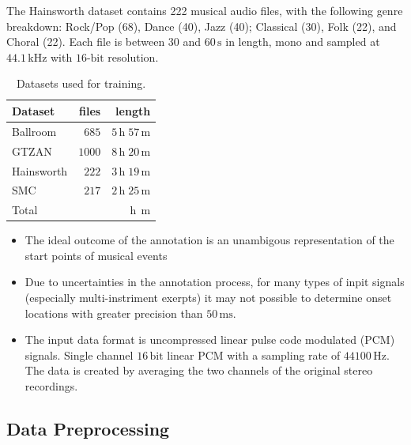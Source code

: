 \documentclass{scrartcl}
\begin{document}
The Hainsworth dataset \cite{Hainsworth2004} contains 222 musical audio files, with the following genre breakdown: Rock/Pop (68), Dance (40), Jazz (40); Classical (30), Folk (22), and Choral (22). Each file is between $30$ and $60\,\text{s}$ in length, mono and sampled at $44.1\,\text{kHz}$ with $16\text{-bit}$ resolution.
\begin{table}[htbp]
\caption{Datasets used for training.}
\label{tab:datasets}
\centering

\begin{tabular}{lrr}
\hline

\hline
\textbf{Dataset} & \textbf{files} & \textbf{length} \\
\hline
    Ballroom \cite{Gouyon2006b, Krebs2013} & $685$ & $5\,\text{h} \;57\,\text{m}$\\
    GTZAN \cite{Tzanetakis2002b, marchand2015swing} & $1000$ & $8\,\text{h}\;20\,\text{m}$\\
    Hainsworth \cite{Hainsworth2004} & $222$ & $3\,\text{h}\;19\,\text{m}$\\
    SMC \cite{Holzapfel2012} & $217$ & $2\,\text{h}\;25\,\text{m}$\\    
\hline
    Total & $ $ & $ \,\text{h}\; \,\text{m}$\\  
\hline

\hline
\end{tabular}
\end{table}  


\begin{itemize}
\item The ideal outcome of the annotation is an unambigous representation of the start points of musical events
\item Due to uncertainties in the annotation process, for many types of inpit signals (especially multi-instriment exerpts) it may not possible to determine onset locations with greater precision than $50\,\text{ms}$. \cite{Leveau2004}
\item The input data format is uncompressed linear pulse code modulated (PCM) signals. Single channel $16\,\text{bit}$ linear PCM with a sampling rate of $44100\,\text{Hz}$. The data is created by averaging the two channels of the original stereo recordings.
\end{itemize}


\subsection{Data Preprocessing}
\end{document}
